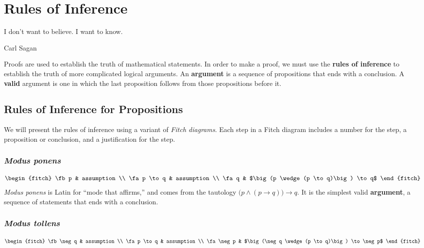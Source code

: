 \chapter{Rules of Inference}
  \epigraph{I don't want to believe. I want to know.}
{Carl Sagan}
Proofs are used to establish the truth of mathematical statements. In order to
make a proof, we must use the \textbf{rules of inference} to establish the truth of more complicated logical arguments. An
\textbf{argument} is a sequence of propositions that ends with a conclusion. A
\textbf{valid} argument is one in which the last proposition follows from those
propositions before it.

\section{Rules of Inference for Propositions}

We will present the rules of inference using a variant of \emph{Fitch diagrams}.
Each step in a Fitch diagram includes a number for the step, a proposition or conclusion,
and a justification for the step.

\subsection{\emph{Modus ponens}}\label{modus_ponens}
\begin{equation*}
  \begin{fitch}
    \fb p       & assumption \\
    \fa p \to q & assumption \\
    \fa  q & $\big(p \wedge (p \to q)\big) \to q$
  \end{fitch}
\end{equation*}
\emph{Modus ponens} is Latin for ``mode that affirms,'' and comes from the
tautology $\big(p \wedge (p \to q)\big) \to q$. It is the simplest valid
\textbf{argument}, a sequence of statements that ends with a conclusion.

\subsection{\emph{Modus tollens}}
\begin{equation*}
  \begin{fitch}
    \fb \neg q  & assumption \\
    \fa p \to q & assumption \\
    \fa \neg p & $\big(\neg q \wedge (p \to q)\big) \to \neg p$
  \end{fitch}
\end{equation*}

